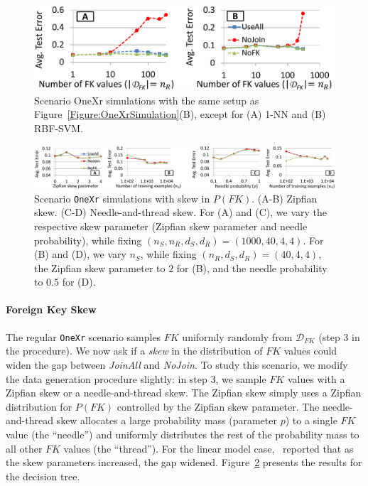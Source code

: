 \documentclass{vldb}
\begin{document}
\begin{figure}[t]
\centering
\includegraphics[width=0.99\linewidth]{onexr_svm_1nn.pdf}
\caption{Scenario OneXr simulations with the same setup as Figure~\ref{Figure:OneXrSimulation}(B), except for (A) 1-NN and (B) RBF-SVM.}
\label{Figure:OneXr1nnSVMSimulation}
\end{figure}

\begin{figure}[t]
\centering
\includegraphics[width=2\columnwidth,height=\textheight,keepaspectratio]{skewfk_onexr.pdf}
\caption{Scenario \texttt{OneXr} simulations with skew in $P(FK)$. (A-B) Zipfian skew. (C-D) Needle-and-thread skew. For (A) and (C), we vary the respective skew parameter
(Zipfian skew parameter and needle probability), while fixing $(n_S, n_R, d_S, d_R) = (1000, 40, 4, 4)$. For (B) and (D), we vary $n_S$, while fixing $(n_R, d_S, d_R) = (40, 4, 4)$,
the Zipfian skew parameter to $2$ for (B), and the needle probability to $0.5$ for (D).
}
\label{Figure:OneXrZipfSimulation}
\end{figure}

\paragraph*{Foreign Key Skew}
The regular \texttt{OneXr} scenario samples $FK$ uniformly randomly from $\mathcal{D}_{FK}$ (step 3 in the procedure). We now ask if a \textit{skew} in 
the distribution of $FK$ values could widen the gap between \textit{JoinAll} and \textit{NoJoin}. To study this scenario, we modify the data generation procedure slightly:
in step 3, we sample $FK$ values with a Zipfian skew or a needle-and-thread skew. The Zipfian skew simply uses a Zipfian distribution for $P(FK)$ controlled by the Zipfian
skew parameter. The needle-and-thread skew allocates a large probability mass (parameter $p$) to a single $FK$ value (the ``needle'') and uniformly distributes the rest of 
the probability mass to all other $FK$ values (the ``thread''). For the linear model case,~\cite{hamlet} reported that as the skew parameters increased, the gap widened.
Figure~\ref{Figure:OneXrZipfSimulation} presents the results for the decision tree.
\end{document}
